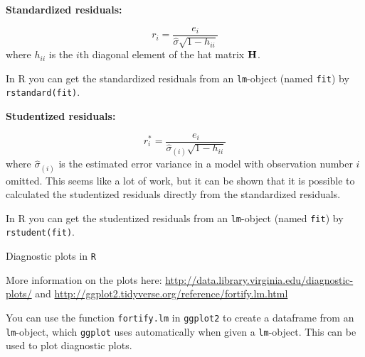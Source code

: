 \documentclass[ignorenonframetext,]{beamer}
\begin{document}
\begin{frame}[fragile]

\textbf{Standardized residuals:}

\[r_i=\frac{e_i}{\hat{\sigma}\sqrt{1-h_{ii}}}\] where \(h_{ii}\) is the
\(i\)th diagonal element of the hat matrix \({\bf H}\).

In R you can get the standardized residuals from an \texttt{lm}-object
(named \texttt{fit}) by \texttt{rstandard(fit)}.

\textbf{Studentized residuals:}

\[r^*_i=\frac{e_i}{\hat{\sigma}_{(i)}\sqrt{1-h_{ii}}}\] where
\(\hat{\sigma}_{(i)}\) is the estimated error variance in a model with
observation number \(i\) omitted. This seems like a lot of work, but it
can be shown that it is possible to calculated the studentized residuals
directly from the standardized residuals.

In R you can get the studentized residuals from an \texttt{lm}-object
(named \texttt{fit}) by \texttt{rstudent(fit)}.

\end{frame}

\begin{frame}[fragile]

\begin{block}{Diagnostic plots in \texttt{R}}

More information on the plots here:
\url{http://data.library.virginia.edu/diagnostic-plots/} and
\url{http://ggplot2.tidyverse.org/reference/fortify.lm.html}

You can use the function \texttt{fortify.lm} in \texttt{ggplot2} to
create a dataframe from an \texttt{lm}-object, which \texttt{ggplot}
uses automatically when given a \texttt{lm}-object. This can be used to
plot diagnostic plots.

\end{block}

\end{frame}
\end{document}
